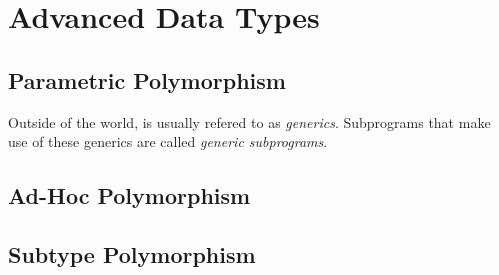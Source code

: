 \section{Advanced Data Types}\label{sec:Advanced_Data_Types}
\begin{definition}[Polymorphism]\label{def:Polymorphism}
  
\end{definition}

\subsection{Parametric Polymorphism}\label{subsec:Parametric_Polymorphism}
\begin{definition}\label{def:Parametric_Polymorphism}

  \begin{remark}[Generics]\label{rmk:Generics}
    Outside of the  world,  is usually refered to as \emph{generics}.
    Subprograms that make use of these generics are called \emph{generic subprograms}.
  \end{remark}
\end{definition}

\subsection{Ad-Hoc Polymorphism}\label{subsec:Ad_Hoc_Polymorphism}
\begin{definition}\label{def:Ad_Hoc_Polymorphism}
  
\end{definition}

\subsection{Subtype Polymorphism}\label{subsec:Subtype_Polymorphism}
\begin{definition}\label{def:Subtype_Polymorphism}
  
\end{definition}


